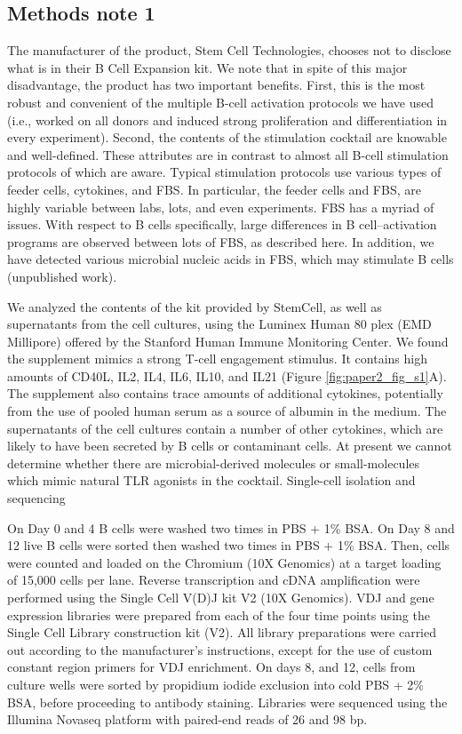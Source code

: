 \subsection{Methods note 1}
The manufacturer of the product, Stem Cell Technologies, chooses not to disclose what is in their B Cell Expansion kit. We note that in spite of this major disadvantage, the product has two important benefits. First, this is the most robust and convenient of the multiple B-cell activation protocols we have used (i.e., worked on all donors and induced strong proliferation and differentiation in every experiment). Second, the contents of the stimulation cocktail are knowable and well-defined. These attributes are in contrast to almost all B-cell stimulation protocols of which are aware. Typical stimulation protocols use various types of feeder cells, cytokines, and FBS. In particular, the feeder cells and FBS, are highly variable between labs, lots, and even experiments. FBS has a myriad of issues\cite{gstraunthaler_plea_2013}. With respect to B cells specifically, large differences in B cell–activation programs are observed between lots of FBS, as described here\cite{haniuda_induced_2019}. In addition, we have detected various microbial nucleic acids in FBS, which may stimulate B cells (unpublished work).

We analyzed the contents of the kit provided by StemCell, as well as supernatants from the cell cultures, using the Luminex Human 80 plex (EMD Millipore) offered by the Stanford Human Immune Monitoring Center. We found the supplement mimics a strong T-cell engagement stimulus. It contains high amounts of CD40L, IL2, IL4, IL6, IL10, and IL21 (Figure \ref{fig:paper2_fig_s1}A). The supplement also contains trace amounts of additional cytokines, potentially from the use of pooled human serum as a source of albumin in the medium. The supernatants of the cell cultures contain a number of other cytokines, which are likely to have been secreted by B cells or contaminant cells. At present we cannot determine whether there are microbial-derived molecules or small-molecules which mimic natural TLR agonists in the cocktail.
Single-cell isolation and sequencing

On Day 0 and 4 B cells were washed two times in PBS + 1\% BSA. On Day 8 and 12 live B cells were sorted then washed two times in PBS + 1\% BSA. Then, cells were counted and loaded on the Chromium (10X Genomics) at a target loading of 15,000 cells per lane. Reverse transcription and cDNA amplification were performed using the Single Cell V(D)J kit V2 (10X Genomics). VDJ and gene expression libraries were prepared from each of the four time points using the Single Cell Library construction kit (V2). All library preparations were carried out according to the manufacturer’s instructions, except for the use of custom constant region primers\cite{horns_lineage_2016} for VDJ enrichment. On days 8, and 12, cells from culture wells were sorted by propidium iodide exclusion into cold PBS + 2\% BSA, before proceeding to antibody staining. Libraries were sequenced using the Illumina Novaseq platform with paired-end reads of 26 and 98 bp.

